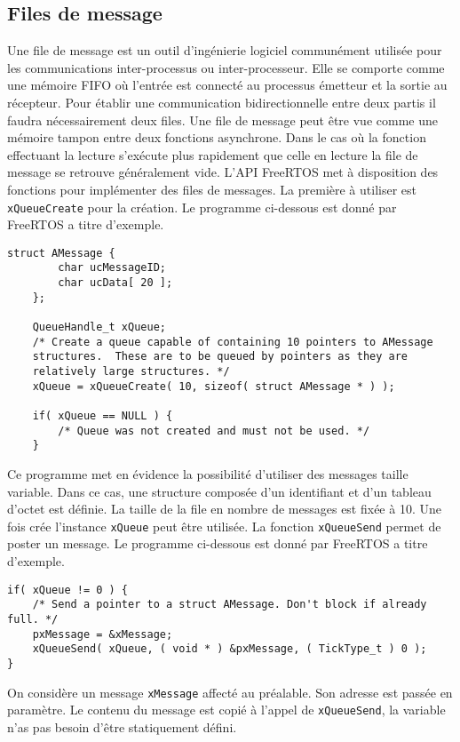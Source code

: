 \subsection{Files de message}
Une file de message est un outil d'ingénierie logiciel communément utilisée pour les communications inter-processus ou inter-processeur.
Elle se comporte comme une mémoire FIFO où l'entrée est connecté au processus émetteur et la sortie au récepteur.
Pour établir une communication bidirectionnelle entre deux partis il faudra nécessairement deux files.
Une file de message peut être vue comme une mémoire tampon entre deux fonctions asynchrone. 
Dans le cas où la fonction effectuant la lecture s’exécute plus rapidement que celle en lecture la file de message se
retrouve généralement vide.
L'API FreeRTOS met à disposition des fonctions pour implémenter des files de messages.
La première à utiliser est \texttt{xQueueCreate} pour la création.
Le programme ci-dessous est donné par FreeRTOS \cite{web_freeRTOS_createQueue} a titre d'exemple.
\begin{lstlisting}[style=CStyle]
    struct AMessage {
        char ucMessageID;
        char ucData[ 20 ];
    };

    QueueHandle_t xQueue;
    /* Create a queue capable of containing 10 pointers to AMessage
    structures.  These are to be queued by pointers as they are
    relatively large structures. */
    xQueue = xQueueCreate( 10, sizeof( struct AMessage * ) );

    if( xQueue == NULL ) {
        /* Queue was not created and must not be used. */
    }
\end{lstlisting}
Ce programme met en évidence la possibilité d'utiliser des messages taille variable.
Dans ce cas, une structure composée d'un identifiant et d'un tableau d'octet est définie.
La taille de la file en nombre de messages est fixée à 10.
Une fois crée l'instance \texttt{xQueue} peut être utilisée.
La fonction \texttt{xQueueSend} permet de poster un message.
Le programme ci-dessous est donné par FreeRTOS \cite{web_freeRTOS_queueSend} a titre d'exemple.
\begin{lstlisting}[style=CStyle]
if( xQueue != 0 ) {
    /* Send a pointer to a struct AMessage. Don't block if already full. */
    pxMessage = &xMessage;
    xQueueSend( xQueue, ( void * ) &pxMessage, ( TickType_t ) 0 );
}
\end{lstlisting}
On considère un message \texttt{xMessage} affecté au préalable.
Son adresse est passée en paramètre.
Le contenu du message est copié à l'appel de \texttt{xQueueSend}, la variable n'as pas besoin d'être statiquement défini.
